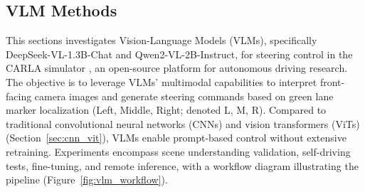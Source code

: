 

\subsection{VLM Methods}
\label{subsec:vlm_methods}

This sections investigates Vision-Language Models (VLMs), specifically DeepSeek-VL-1.3B-Chat and Qwen2-VL-2B-Instruct, for steering control in the CARLA simulator \cite{Dosovitskiy2017}, an open-source platform for autonomous driving research. The objective is to leverage VLMs' multimodal capabilities to interpret front-facing camera images and generate steering commands based on green lane marker localization (Left, Middle, Right; denoted L, M, R). Compared to traditional convolutional neural networks (CNNs) and vision transformers (ViTs) (Section~\ref{sec:cnn_vit}), VLMs enable prompt-based control without extensive retraining. Experiments encompass scene understanding validation, self-driving tests, fine-tuning, and remote inference, with a workflow diagram illustrating the pipeline (Figure~\ref{fig:vlm_workflow}).

